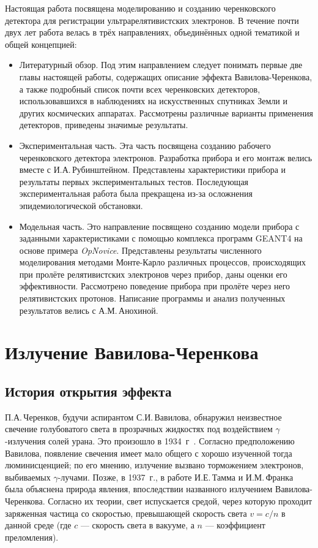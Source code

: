 \documentclass[12pt,a4paper]{report} %
\begin{document}
Настоящая работа посвящена моделированию и созданию черенковского детектора для регистрации ультрарелятивистских электронов.
В течение почти двух лет работа велась в трёх направлениях, объединённых одной тематикой и общей концепцией:
\begin{itemize}
	\item Литературный обзор. Под этим направлением следует понимать первые две главы настоящей работы, содержащих описание эффекта Вавилова-Черенкова, а также подробный список почти всех черенковских детекторов, использовавшихся в наблюдениях на искусственных спутниках Земли и других космических аппаратах. Рассмотрены различные варианты применения детекторов, приведены значимые  результаты.
	\item Экспериментальная часть. Эта часть посвящена созданию рабочего черенковского детектора электронов. Разработка прибора и его монтаж велись вместе с И.А.\,Рубинштейном. Представлены характеристики прибора и результаты первых экспериментальных тестов. Последующая экспериментальная работа была прекращена из-за осложнения эпидемиологической обстановки.
	\item Модельная часть. Это направление посвящено созданию модели прибора с заданными характеристиками с помощью комплекса программ GEANT4 на основе примера \textit{OpNovice}. Представлены результаты численного моделирования методами Монте-Карло различных процессов, происходящих при пролёте релятивистских электронов через прибор, даны оценки его эффективности. Рассмотрено поведение прибора при пролёте через него релятивистских протонов. Написание программы и анализ полученных результатов велись с А.М.\,Анохиной.
\end{itemize}

\chapter{Излучение Вавилова-Черенкова}
\section{История открытия эффекта}

П.А.\,Черенков, будучи аспирантом С.И.\,Вавилова, обнаружил неизвестное свечение голубоватого света в прозрачных жидкостях под воздействием $\gamma$-излучения солей урана. Это произошло в 1934~г~\cite{Cerenkov}. Согласно предположению Вавилова, появление свечения имеет мало общего с хорошо изученной тогда люминисценцией; по его мнению, излучение вызвано торможением электронов, выбиваемых $\gamma$-лучами. Позже, в 1937~г., в работе И.Е.\,Тамма и И.М.\,Франка~\cite{Tamm} была объяснена природа явления,  впоследствии названного излучением Вавилова-Черенкова. Согласно их теории, свет испускается средой, через которую проходит заряженная частица со скоростью, превышающей скорость света $v = c / n$ в данной среде (где $c$ --- скорость света в вакууме, а $n$ --- коэффициент преломления). 
\end{document}
